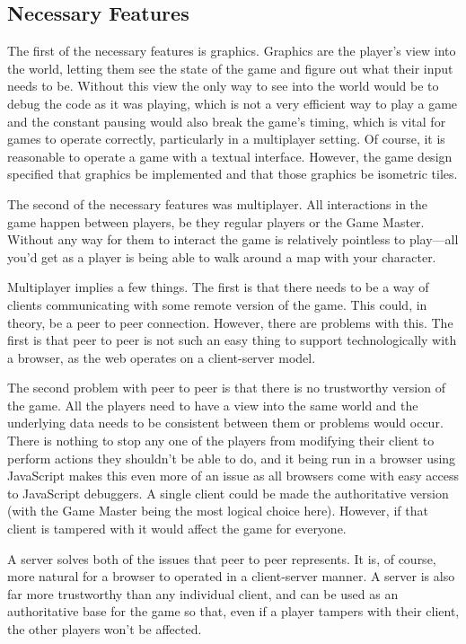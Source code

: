 \subsection{Necessary Features}
The first of the necessary features is graphics. Graphics are the player's view into the world, letting them see the state of the game and figure out what their input needs to be. Without this view the only way to see into the world would be to debug the code as it was playing, which is not a very efficient way to play a game and the constant pausing would also break the game's timing, which is vital for games to operate correctly, particularly in a multiplayer setting. Of course, it is reasonable to operate a game with a textual interface. However, the game design specified that graphics be implemented and that those graphics be isometric tiles.

The second of the necessary features was multiplayer. All interactions in the game happen between players, be they regular players or the Game Master. Without any way for them to interact the game is relatively pointless to play---all you'd get as a player is being able to walk around a map with your character.

Multiplayer implies a few things. The first is that there needs to be a way of clients communicating with some remote version of the game. This could, in theory, be a peer to peer connection. However, there are problems with this. The first is that peer to peer is not such an easy thing to support technologically with a browser, as the web operates on a client-server model.

The second problem with peer to peer is that there is no trustworthy version of the game. All the players need to have a view into the same world and the underlying data needs to be consistent between them or problems would occur. There is nothing to stop any one of the players from modifying their client to perform actions they shouldn't be able to do, and it being run in a browser using JavaScript makes this even more of an issue as all browsers come with easy access to JavaScript debuggers. A single client could be made the authoritative version (with the Game Master being the most logical choice here). However, if that client is tampered with it would affect the game for everyone.

A server solves both of the issues that peer to peer represents. It is, of course, more natural for a browser to operated in a client-server manner. A server is also far more trustworthy than any individual client, and can be used as an authoritative base for the game so that, even if a player tampers with their client, the other players won't be affected.

